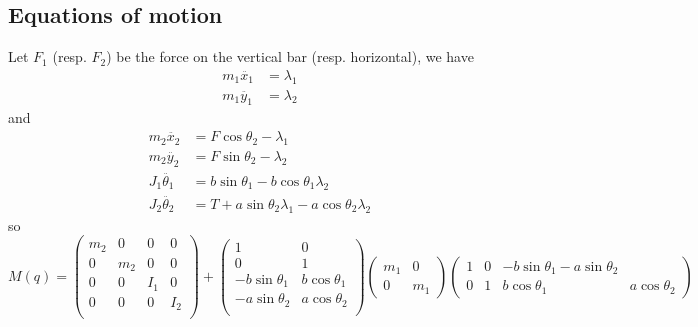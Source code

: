 \subsection{Equations of motion}
Let $F_1$ (resp. $F_2$) be the force on the vertical bar (resp. horizontal), we have
\begin{align*}
m_1\ddot{x_1} &= \lambda_1\\
m_1\ddot{y_1} &= \lambda_2
\end{align*}
and
\begin{align*}
m_2\ddot{x_2} &= F\cos\theta_2 - \lambda_1\\
m_2\ddot{y_2} &=  F\sin\theta_2 - \lambda_2 \\
J_1\ddot{\theta_1} &= b\sin\theta_1 - b \cos\theta_1\lambda_2\\
J_2\ddot{\theta_2} &= T+a\sin\theta_2\lambda_1 - a \cos\theta_2\lambda_2
\end{align*}
so
$$M(q) = \left( \begin{array}{cccc}
m_2 & 0 & 0 & 0\\
0 & m_2 & 0 & 0\\
0 & 0 & I_1 & 0\\
0 & 0 & 0 & I_2\\
\end{array} \right) +
 \left( \begin{array}{cc}
1 & 0\\
0 & 1\\
-b\sin\theta_1 & b\cos\theta_1\\
-a\sin\theta_2 & a\cos\theta_2\\
\end{array} \right)  \left( \begin{array}{cc}
m_1 & 0\\
0 & m_1
\end{array} \right)
\left( \begin{array}{cccc}
1 & 0 & -b\sin\theta_1 -a\sin\theta_2\\
0 & 1 & b\cos\theta_1 & a\cos\theta_2
\end{array} \right)$$
